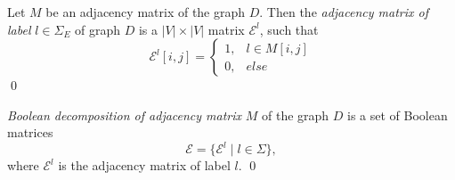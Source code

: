 \begin{definition}
Let $M$ be an adjacency matrix of the graph $D$. Then the \emph{adjacency matrix of label} $l \in \Sigma_E$ of graph $D$ is a $|V| \times |V|$ matrix $\mathcal{E}^l$, such that
\begin{equation*}
\mathcal{E}^l[i,j] =
 \begin{cases}
   1, & l \in M[i,j]\\
   0, & else
 \end{cases}
\end{equation*} \qed
\end{definition}

\begin{definition}
\emph{Boolean decomposition of adjacency matrix} $M$ of the graph $D$ is a set of Boolean matrices $$\mathcal{E} = \{\mathcal{E}^l \mid l \in \Sigma\},$$
where $\mathcal{E}^l$ is the adjacency matrix of label $l$. \qed
\end{definition}

